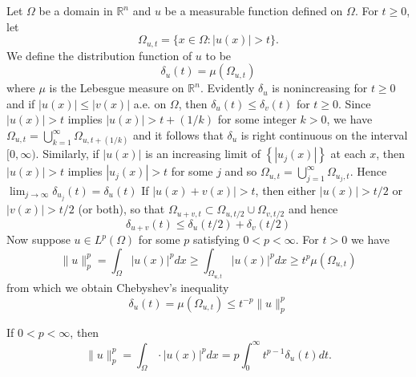 \begin{para}
  Let $\Omega$ be a domain in $\mathbb{R}^n$ and $u$ be a measurable function defined on $\Omega$. For $t \geq 0$, let
  \[
  \Omega_{u, t}=\{x \in \Omega:|u(x)|>t\} .
  \]
  We define the distribution function of $u$ to be
  \[
  \delta_u(t)=\mu\left(\Omega_{u, t}\right)
  \]
  where $\mu$ is the Lebesgue measure on $\mathbb{R}^n$. Evidently $\delta_u$ is nonincreasing for $t \geq 0$ and if $|u(x)| \leq|v(x)|$ a.e. on $\Omega$, then $\delta_u(t) \leq \delta_v(t)$ for $t \geq 0$.
  Since $|u(x)|>t$ implies $|u(x)|>t+(1 / k)$ for some integer $k>0$, we have $\Omega_{u, t}=\bigcup_{k=1}^{\infty} \Omega_{u, t+(1 / k)}$ and it follows that $\delta_u$ is right continuous on the interval $[0, \infty)$. Similarly, if $|u(x)|$ is an increasing limit of $\left\{\left|u_j(x)\right|\right\}$ at each $x$, then $|u(x)|>t$ implies $\left|u_j(x)\right|>t$ for some $j$ and so $\Omega_{u, t}=\bigcup_{j=1}^{\infty} \Omega_{u_j, t}$. Hence
  $\lim _{j \rightarrow \infty} \delta_{u_j}(t)=\delta_u(t)$
  If $|u(x)+v(x)|>t$, then either $|u(x)|>t / 2$ or $|v(x)|>t / 2$ (or both), so that $\Omega_{u+v, t} \subset \Omega_{u, t / 2} \cup \Omega_{v, t / 2}$ and hence
  \[
  \delta_{u+v}(t) \leq \delta_u(t / 2)+\delta_v(t / 2)
  \]
  Now suppose $u \in L^p(\Omega)$ for some $p$ satisfying $0<p<\infty$. For $t>0$ we have
  \[
  \|u\|_p^p=\int_{\Omega}|u(x)|^p d x \geq \int_{\Omega_{u, t}}|u(x)|^p d x \geq t^p \mu\left(\Omega_{u, t}\right)
  \]
  from which we obtain Chebyshev's inequality
  \[
  \delta_u(t)=\mu\left(\Omega_{u, t}\right) \leq t^{-p}\|u\|_p^p
  \]
\end{para}


\begin{lemma}
  If $0<p<\infty$, then
  \begin{equation}\label{eq:2.43}
    \|u\|_p^p=\int_{\Omega} \cdot|u(x)|^p d x=p \int_0^{\infty} t^{p-1} \delta_u(t) d t.  
  \end{equation}
\end{lemma}

